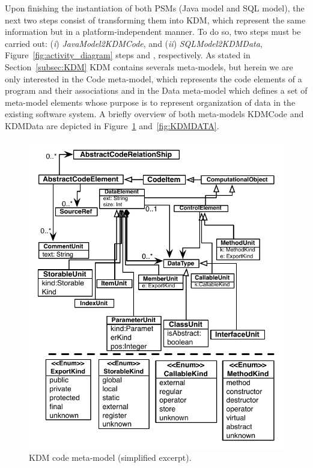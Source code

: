 \documentclass[a4paper,twoside]{article}
\newcommand*\circled[1]{\tikz[baseline=(char.base)]{
  \node[shape=circle,draw, inner sep=0.1pt] (char) {#1};}
}
\begin{document}
Upon finishing the instantiation of both PSMs (Java model and SQL model), the next two steps consist of transforming them into KDM, which represent the same information but in a platform-independent manner. To do so, two steps must be carried out: (\textit{i}) \textit{JavaModel2KDMCode}, and (\textit{ii}) \textit{SQLModel2KDMData}, Figure~\ref{fig:activity_diagram} steps \circled{\textbf{E}} and \circled{\textbf{F}}, respectively. %
As stated in Section~\ref{subsec:KDM} KDM contains severals meta-models, but herein we are only interested in the Code meta-model, which represents the code elements of a program and their associations and in the Data meta-model which defines a set of meta-model elements whose purpose is to represent organization of data in the existing software system. A briefly overview of both meta-models KDMCode and KDMData are depicted in Figure~\ref{fig:KDMSOurce} and~\ref{fig:KDMDATA}. 


\begin{figure}[!h]
\centering
  \includegraphics[scale=0.70]{figuras/KDM-Program-Layer}
\caption{KDM code meta-model (simplified excerpt).}
\label{fig:KDMSOurce}
\end{figure}
\end{document}
